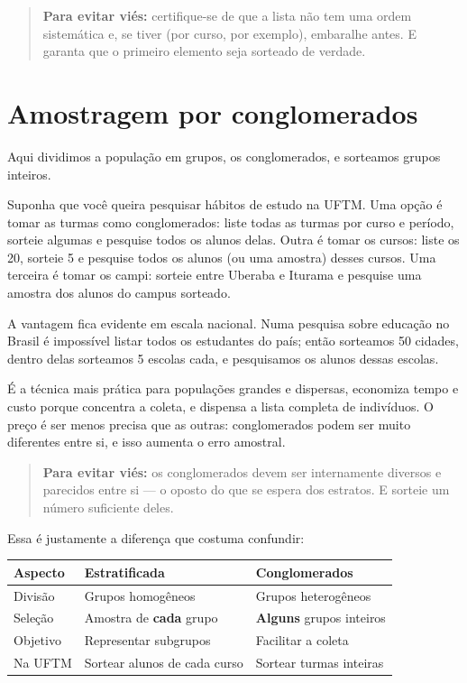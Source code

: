 \documentclass[
]{book}
\newcounter{none} %
\begin{document}
\begin{quote}
\textbf{Para evitar viés:} certifique-se de que a lista não tem uma ordem sistemática e, se tiver (por curso, por exemplo), embaralhe antes. E garanta que o primeiro elemento seja sorteado de verdade.
\end{quote}

\section{Amostragem por conglomerados}\label{amostragem-por-conglomerados}

Aqui dividimos a população em grupos, os conglomerados, e sorteamos grupos inteiros.

Suponha que você queira pesquisar hábitos de estudo na UFTM. Uma opção é tomar as turmas como conglomerados: liste todas as turmas por curso e período, sorteie algumas e pesquise todos os alunos delas. Outra é tomar os cursos: liste os 20, sorteie 5 e pesquise todos os alunos (ou uma amostra) desses cursos. Uma terceira é tomar os campi: sorteie entre Uberaba e Iturama e pesquise uma amostra dos alunos do campus sorteado.

A vantagem fica evidente em escala nacional. Numa pesquisa sobre educação no Brasil é impossível listar todos os estudantes do país; então sorteamos 50 cidades, dentro delas sorteamos 5 escolas cada, e pesquisamos os alunos dessas escolas.

É a técnica mais prática para populações grandes e dispersas, economiza tempo e custo porque concentra a coleta, e dispensa a lista completa de indivíduos. O preço é ser menos precisa que as outras: conglomerados podem ser muito diferentes entre si, e isso aumenta o erro amostral.

\begin{quote}
\textbf{Para evitar viés:} os conglomerados devem ser internamente diversos e parecidos entre si --- o oposto do que se espera dos estratos. E sorteie um número suficiente deles.
\end{quote}

Essa é justamente a diferença que costuma confundir:

{\def\LTcaptype{none} %
\begin{longtable}[]{@{}lll@{}}
\toprule\noalign{}
Aspecto & Estratificada & Conglomerados \\
\midrule\noalign{}
\endhead
\bottomrule\noalign{}
\endlastfoot
Divisão & Grupos homogêneos & Grupos heterogêneos \\
Seleção & Amostra de \textbf{cada} grupo & \textbf{Alguns} grupos inteiros \\
Objetivo & Representar subgrupos & Facilitar a coleta \\
Na UFTM & Sortear alunos de cada curso & Sortear turmas inteiras \\
\end{longtable}
}
\end{document}
